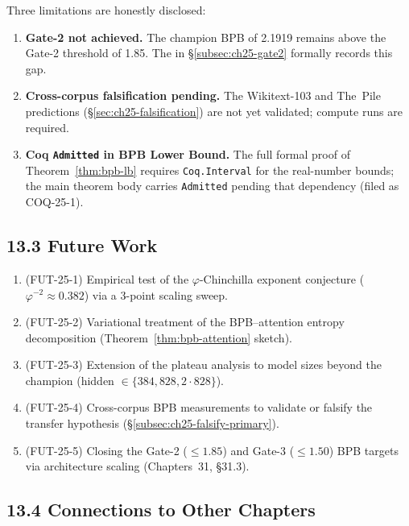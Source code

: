 Three limitations are honestly disclosed:
\begin{enumerate}
  \item \textbf{Gate-2 not achieved.}  The champion BPB of 2.1919
    remains above the Gate-2 threshold of 1.85.  The \admittedbox{}
    in §\ref{subsec:ch25-gate2} formally records this gap.
  \item \textbf{Cross-corpus falsification pending.}  The Wikitext-103
    and The~Pile predictions (§\ref{sec:ch25-falsification}) are not
    yet validated; compute runs are required.
  \item \textbf{Coq \texttt{Admitted} in BPB Lower Bound.}
    The full formal proof of Theorem~\ref{thm:bpb-lb} requires
    \texttt{Coq.Interval} for the real-number bounds;
    the main theorem body carries \texttt{Admitted} pending that
    dependency (filed as COQ-25-1).
\end{enumerate}

\subsection{13.3 Future Work}
\label{subsec:ch25-discussion-future}

\begin{enumerate}
  \item (FUT-25-1) Empirical test of the $\varphi$-Chinchilla exponent
    conjecture ($\varphi^{-2} \approx 0.382$) via a 3-point scaling sweep.
  \item (FUT-25-2) Variational treatment of the BPB–attention entropy
    decomposition (Theorem~\ref{thm:bpb-attention} sketch).
  \item (FUT-25-3) Extension of the plateau analysis to model sizes
    beyond the champion (hidden $\in \{384, 828, 2 \cdot 828\}$).
  \item (FUT-25-4) Cross-corpus BPB measurements to validate or
    falsify the transfer hypothesis (§\ref{subsec:ch25-falsify-primary}).
  \item (FUT-25-5) Closing the Gate-2 ($\le 1.85$) and Gate-3
    ($\le 1.50$) BPB targets via architecture scaling
    (Chapters~31, §31.3).
\end{enumerate}

\subsection{13.4 Connections to Other Chapters}
\label{subsec:ch25-discussion-connections}

